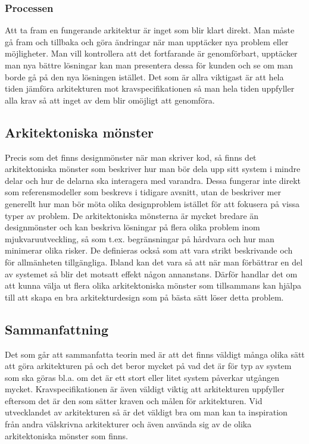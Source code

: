 \subsubsection{Processen}
Att ta fram en fungerande arkitektur är inget som blir klart direkt. Man måste gå fram och tillbaka och göra ändringar när man upptäcker nya problem eller möjligheter. Man vill kontrollera att det fortfarande är genomförbart, upptäcker man nya bättre lösningar kan man presentera dessa för kunden och se om man borde gå på den nya lösningen istället. Det som är allra viktigast är att hela tiden jämföra arkitekturen mot kravspecifikationen så man hela tiden uppfyller alla krav så att inget av dem blir omöjligt att genomföra. \cite[s. 228--230]{set} %

\subsection{Arkitektoniska mönster}
Precis som det finns designmönster när man skriver kod, så finns det arkitektoniska mönster som beskriver hur man bör dela upp sitt system i mindre delar och hur de delarna ska interagera med varandra. Dessa fungerar inte direkt som referensmodeller som beskrevs i tidigare avsnitt, utan de beskriver mer generellt hur man bör möta olika designproblem istället för att fokusera på vissa typer av problem.
\newline
\newline
De arkitektoniska mönsterna är mycket bredare än designmönster och kan beskriva lösningar på flera olika problem inom mjukvaruutveckling, så som t.ex. begränsningar på hårdvara och hur man minimerar olika risker. De definieras också som att vara strikt beskrivande och för allmänheten tillgängliga.
\newline
\newline
Ibland kan det vara så att när man förbättrar en del av systemet så blir det motsatt effekt någon annanstans. Därför handlar det om att kunna välja ut flera olika arkitektoniska mönster som tillsammans kan hjälpa till att skapa en bra arkitekturdesign som på bästa sätt löser detta problem. \cite[s. 226--228]{set}

\subsection{Sammanfattning}
Det som går att sammanfatta teorin med är att det finns väldigt många olika sätt att göra arkitekturen på och det beror mycket på vad det är för typ av system som ska göras bl.a. om det är ett stort eller litet system påverkar utgången mycket. Kravspecifikationen är även väldigt viktig att arkitekturen uppfyller eftersom det är den som sätter kraven och målen för arkitekturen.
\newline
\newline
Vid utvecklandet av arkitekturen så är det väldigt bra om man kan ta inspiration från andra välskrivna arkitekturer och även använda sig av de olika arkitektoniska mönster som finns.

